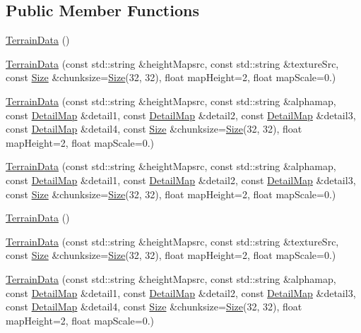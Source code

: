 \subsection*{Public Member Functions}
\begin{DoxyCompactItemize}
\item 
\hyperlink{structTerrain_1_1TerrainData_aea03e8a06e607b652c467e4fd475e0de}{Terrain\+Data} ()
\item 
\hyperlink{structTerrain_1_1TerrainData_a75bf963bf55942f9fcced98ac047d318}{Terrain\+Data} (const std\+::string \&height\+Mapsrc, const std\+::string \&texture\+Src, const \hyperlink{classSize}{Size} \&chunksize=\hyperlink{classSize}{Size}(32, 32), float map\+Height=2, float map\+Scale=0.)
\item 
\hyperlink{structTerrain_1_1TerrainData_a1e4a1574d2ff07e15b3118c3b2396199}{Terrain\+Data} (const std\+::string \&height\+Mapsrc, const std\+::string \&alphamap, const \hyperlink{structTerrain_1_1DetailMap}{Detail\+Map} \&detail1, const \hyperlink{structTerrain_1_1DetailMap}{Detail\+Map} \&detail2, const \hyperlink{structTerrain_1_1DetailMap}{Detail\+Map} \&detail3, const \hyperlink{structTerrain_1_1DetailMap}{Detail\+Map} \&detail4, const \hyperlink{classSize}{Size} \&chunksize=\hyperlink{classSize}{Size}(32, 32), float map\+Height=2, float map\+Scale=0.)
\item 
\hyperlink{structTerrain_1_1TerrainData_ae57aa479b584a59c7dcd44266b91a024}{Terrain\+Data} (const std\+::string \&height\+Mapsrc, const std\+::string \&alphamap, const \hyperlink{structTerrain_1_1DetailMap}{Detail\+Map} \&detail1, const \hyperlink{structTerrain_1_1DetailMap}{Detail\+Map} \&detail2, const \hyperlink{structTerrain_1_1DetailMap}{Detail\+Map} \&detail3, const \hyperlink{classSize}{Size} \&chunksize=\hyperlink{classSize}{Size}(32, 32), float map\+Height=2, float map\+Scale=0.)
\item 
\hyperlink{structTerrain_1_1TerrainData_aea03e8a06e607b652c467e4fd475e0de}{Terrain\+Data} ()
\item 
\hyperlink{structTerrain_1_1TerrainData_a75bf963bf55942f9fcced98ac047d318}{Terrain\+Data} (const std\+::string \&height\+Mapsrc, const std\+::string \&texture\+Src, const \hyperlink{classSize}{Size} \&chunksize=\hyperlink{classSize}{Size}(32, 32), float map\+Height=2, float map\+Scale=0.)
\item 
\hyperlink{structTerrain_1_1TerrainData_a1e4a1574d2ff07e15b3118c3b2396199}{Terrain\+Data} (const std\+::string \&height\+Mapsrc, const std\+::string \&alphamap, const \hyperlink{structTerrain_1_1DetailMap}{Detail\+Map} \&detail1, const \hyperlink{structTerrain_1_1DetailMap}{Detail\+Map} \&detail2, const \hyperlink{structTerrain_1_1DetailMap}{Detail\+Map} \&detail3, const \hyperlink{structTerrain_1_1DetailMap}{Detail\+Map} \&detail4, const \hyperlink{classSize}{Size} \&chunksize=\hyperlink{classSize}{Size}(32, 32), float map\+Height=2, float map\+Scale=0.)

\end{DoxyCompactItemize}
